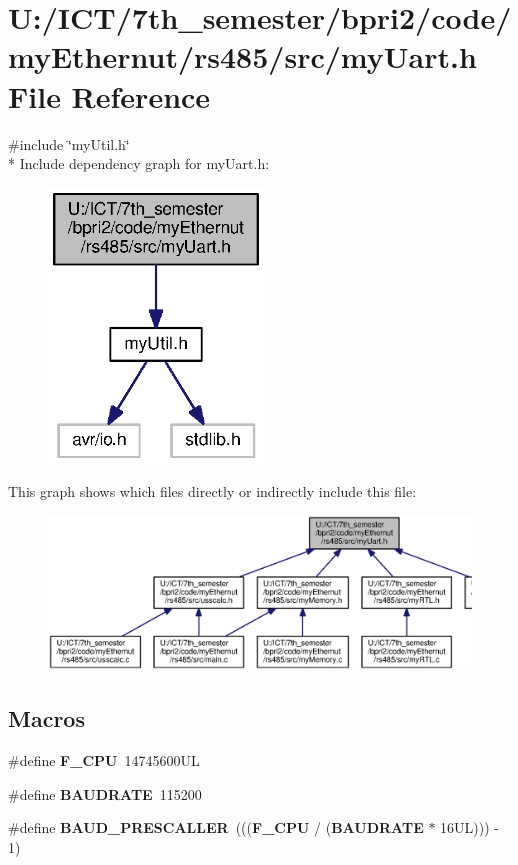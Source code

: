 \section{U\+:/\+I\+C\+T/7th\+\_\+semester/bpri2/code/my\+Ethernut/rs485/src/my\+Uart.h File Reference}
\label{my_uart_8h}
{\ttfamily \#include \char`\"{}my\+Util.\+h\char`\"{}}\\*
Include dependency graph for my\+Uart.\+h\+:\nopagebreak
\begin{figure}[H]
\begin{center}
\leavevmode
\includegraphics[width=162pt]{my_uart_8h__incl}
\end{center}
\end{figure}
This graph shows which files directly or indirectly include this file\+:\nopagebreak
\begin{figure}[H]
\begin{center}
\leavevmode
\includegraphics[width=350pt]{my_uart_8h__dep__incl}
\end{center}
\end{figure}
\subsection*{Macros}
\begin{DoxyCompactItemize}
\item 
\#define {\bf F\+\_\+\+C\+P\+U}~14745600\+U\+L
\item 
\#define {\bf B\+A\+U\+D\+R\+A\+T\+E}~115200
\item 
\#define {\bf B\+A\+U\+D\+\_\+\+P\+R\+E\+S\+C\+A\+L\+L\+E\+R}~((({\bf F\+\_\+\+C\+P\+U} / ({\bf B\+A\+U\+D\+R\+A\+T\+E} $\ast$ 16\+U\+L))) -\/ 1)
\end{DoxyCompactItemize}
